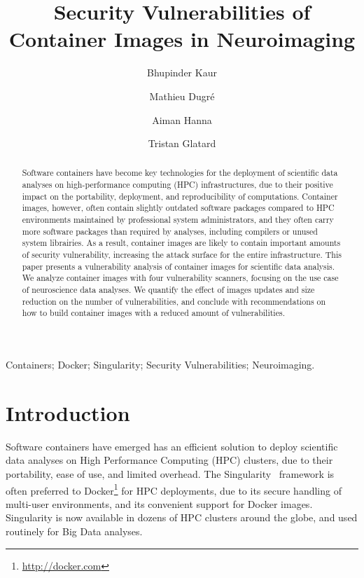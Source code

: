 \documentclass[a4paper,num-refs]{oup-contemporary}
\title{Security Vulnerabilities of Container Images in Neuroimaging}
\begin{document}
\author[1]{Bhupinder Kaur}
\author[1]{Mathieu Dugr\'e}
\author[1]{Aiman Hanna}
\author[1]{Tristan Glatard}


\maketitle

\begin{abstract}
Software containers have become key technologies for the deployment of
scientific data analyses on high-performance computing (HPC)
infrastructures, due to their positive impact on the portability, deployment, and
reproducibility of computations. Container images, however, often contain slightly outdated
software packages compared to HPC environments maintained by professional
 system administrators, and they often carry more
software packages than required by analyses, including compilers or unused
system librairies. As a result, container images are likely to contain
important amounts of security vulnerability, increasing the attack surface
for the entire infrastructure. This paper presents a vulnerability analysis
of container images for scientific data analysis. We analyze container
images with four vulnerability scanners, focusing on the use case of
neuroscience data analyses. We quantify the effect of images updates and
size reduction on the number of vulnerabilities, and conclude with
recommendations on how to build container images with a reduced amount of
vulnerabilities.


\end{abstract}

\begin{keywords}
Containers; Docker; Singularity; Security Vulnerabilities; Neuroimaging.
\end{keywords}

\section{Introduction}

Software containers have emerged has an efficient solution to deploy
scientific data analyses on High Performance Computing (HPC) clusters, due
to their portability, ease of use, and limited overhead. The
Singularity~\cite{kurtzer2017singularity} framework is often preferred to
Docker\footnote{\url{http://docker.com}} for HPC deployments, due to its
secure handling of multi-user environments, and its convenient support for
Docker images. Singularity is now available in dozens of HPC
clusters around the globe, and used routinely for Big Data analyses.
\end{document}
